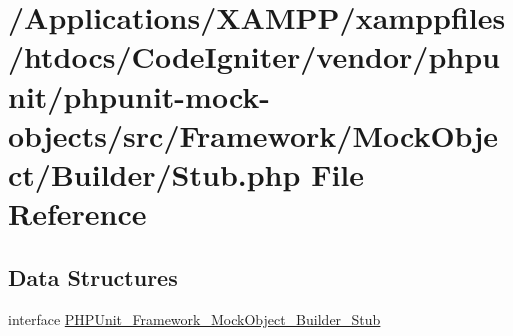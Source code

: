 \hypertarget{_builder_2_stub_8php}{}\section{/\+Applications/\+X\+A\+M\+P\+P/xamppfiles/htdocs/\+Code\+Igniter/vendor/phpunit/phpunit-\/mock-\/objects/src/\+Framework/\+Mock\+Object/\+Builder/\+Stub.php File Reference}
\label{_builder_2_stub_8php}
\subsection*{Data Structures}
\begin{DoxyCompactItemize}
\item 
interface \mbox{\hyperlink{interface_p_h_p_unit___framework___mock_object___builder___stub}{P\+H\+P\+Unit\+\_\+\+Framework\+\_\+\+Mock\+Object\+\_\+\+Builder\+\_\+\+Stub}}
\end{DoxyCompactItemize}

